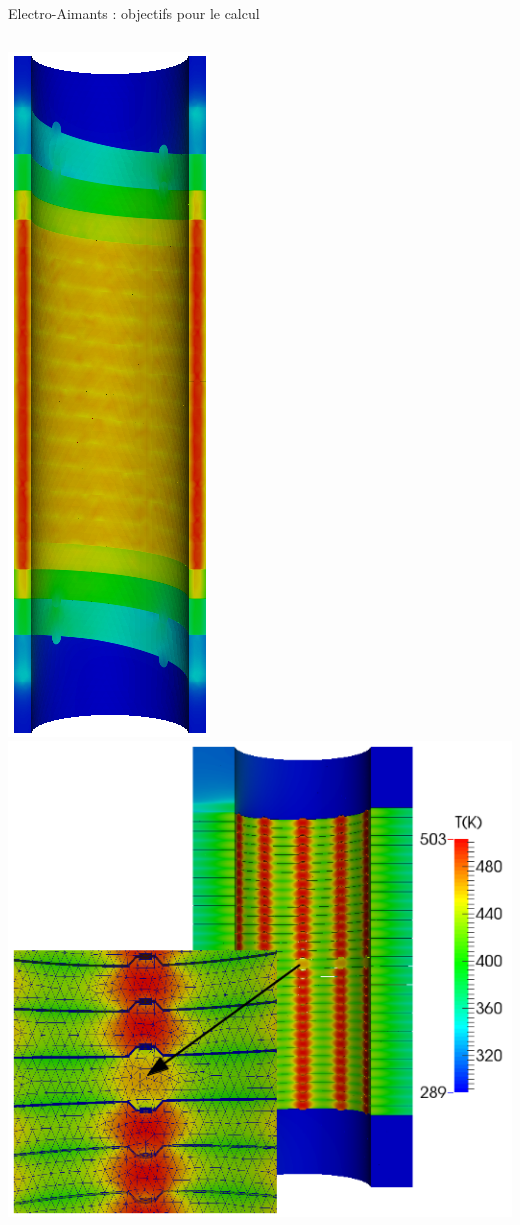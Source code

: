 \begin{frame}{Electro-Aimants : objectifs pour le calcul}
  \begin{columns}[c]
    \includegraphics[height=.4\textheight]{Figures/cmi/temperature_newton_HL31_bmap+dilat_ws2.png}
    \includegraphics[height=.4\textheight]{Figures/cmi/temp_picard_np1024_OT200l170_comp.png}

\end{columns}
\end{frame}
